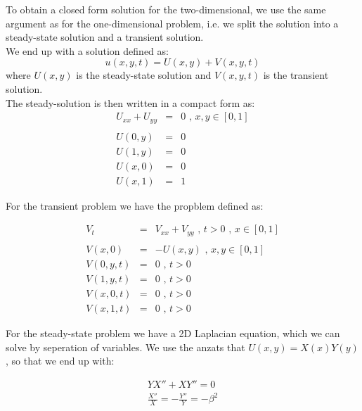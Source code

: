 \documentclass{article}
\begin{document}
To obtain a closed form solution for the two-dimensional, we use the same argument as for the one-dimensional problem, i.e. we split the solution into a steady-state solution and a transient solution.\\

We end up with a solution defined as:
\begin{equation}
u(x,y,t) = U(x,y) + V(x,y,t)
\end{equation}
where $U(x,y)$ is the steady-state solution and $V(x,y,t)$ is the transient solution.\\

The steady-solution is then written in a compact form as:
\begin{subequations}
	\begin{eqnarray}
	U_{xx} + U_{yy} &=& 0 \textit{ , } x,y \in [0,1]\\ \nonumber
	\\
	U(0,y) &=& 0 \textit{  } \\
	U(1,y) &=& 0 \textit{  } \\
	U(x,0) &=& 0 \textit{  } \\
	U(x,1) &=& 1 \textit{  } 
	\end{eqnarray}
\end{subequations}

For the transient problem we have the propblem defined as:

\begin{subequations}
	\begin{eqnarray}
	\label{eqn:transientPDE}
	V_t &=& V_{xx} + V_{yy} \textit{ , } t>0 \textit{ , } x \in [0,1] \\ \nonumber
	\\
	\label{eqn:transientICPDE}
	V(x,0) &=& -U(x,y) \textit{ , } x,y \in [0,1] \\
	V(0,y,t) &=& 0 \textit{ , } t>0 \\
	V(1,y,t) &=& 0 \textit{ , } t>0 \\
	V(x,0,t) &=& 0 \textit{ , } t>0 \\
	V(x,1,t) &=& 0 \textit{ , } t>0 
	\end{eqnarray}
\end{subequations}

For the steady-state problem we have a 2D Laplacian equation, which we can solve by seperation of variables. We use the anzats that $U(x,y) = X(x)Y(y)$, so that we end up with:

\begin{eqnarray}
\nonumber
YX'' + XY''=0 \\ \nonumber
\frac{X''}{X} = - \frac{Y''}{Y} = -\beta^2
\end{eqnarray}
\end{document}
